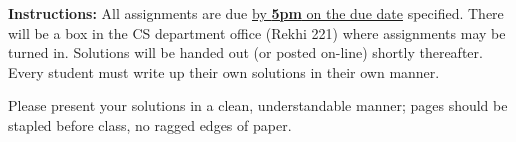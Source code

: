 \documentclass[10pt,addpoints]{exam}
\begin{document}
\extrawidth{0.5in} \extrafootheight{-0in} \pagestyle{headandfoot}
\headrule {} \footrule {}

\ifprintanswers
\else
\noindent \textbf{Instructions:} All assignments are due \underline{by \textbf{5pm} on the due date} specified.  There will be a box in the CS department office (Rekhi 221) where assignments may be turned in.  Solutions will be handed out (or posted on-line) shortly thereafter.  Every student
must write up their own solutions in their own manner.

\smallskip
\noindent Please present your solutions in a clean, understandable
manner; pages should be stapled before class, no ragged edges of
paper.
\fi
\end{document}
